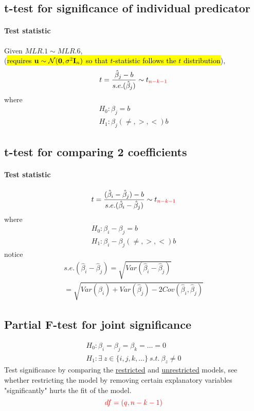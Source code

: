 \documentclass[]{article}
\begin{document}
    	\subsection{t-test for significance of individual predicator}
    		\paragraph{Test statistic} Given $MLR.1 \sim MLR.6$,\\
    		(\hl{requires $\textbf{u} \sim \mathcal{{N}}(\textbf{0}, \sigma^2 \textbf{I}_n)$ so that $t$-statistic follows the $t$ distribution}),
    		\[
    			t = \frac{\hat{\beta}_j - b}{s.e.(\hat{\beta}_j)} \sim t_{\textcolor{red}{n-k-1}}
    		\]
    		where 
    		\begin{gather*}
    			H_0: \beta_j = b \\
    			H_1: \beta_j (\neq, >, <) b
    		\end{gather*}
    	
    	
    	\subsection{t-test for comparing 2 coefficients}
    	\paragraph{Test statistic}
    	\[
    		t = \frac{(\hat{\beta}_i - \hat{\beta}_j) - b}{s.e.(\hat{\beta}_i - \hat{\beta}_j)} \sim t_{\textcolor{red}{n-k-1}}
    	\]
    	where 
    		\begin{gather*}
    			H_0: \beta_i - \beta_j = b \\
    			H_1: \beta_i - \beta_j (\neq, >, <) b
    		\end{gather*}
    	notice
    	\begin{gather*}
    		s.e.(\hat{\beta}_i - \hat{\beta}_j) = \sqrt{Var(\hat{\beta}_i - \hat{\beta}_j)} \\
    		= \sqrt{Var(\hat{\beta}_i) + Var(\hat{\beta}_j) - 2Cov(\hat{\beta}_i, \hat{\beta}_j)}
    	\end{gather*}
    	
    	\subsection{Partial F-test for joint significance}
    	\begin{gather*}
    		H_0: \beta_i = \beta_j = \beta_k = \dots = 0 \\
    		H_1: \exists\ z \in \{i, j, k, \dots \}\ s.t.\ \beta_z \neq 0
    	\end{gather*}
    	Test significance by comparing the \ul{restricted} and \ul{unrestricted} models, see whether restricting the model by removing certain explanatory variables "significantly" hurts the fit of the model.
    	\[
    		\textcolor{red}{df = (q, n-k-1)}
    	\]
\end{document}
